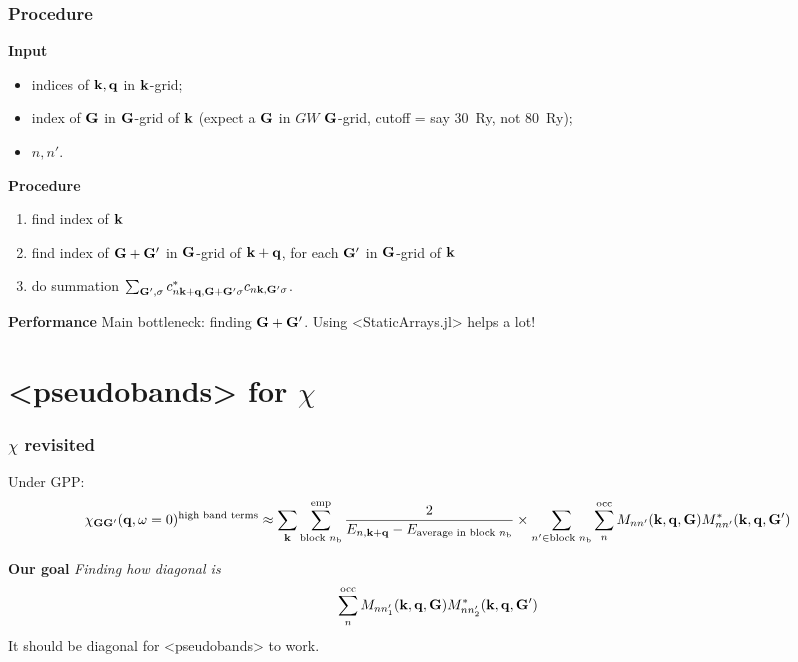 \documentclass[t]{beamer}
\newcommand{\shortcode}[1]{\texttt{#1}}
\def\\{}%
\def\texttt#1{<#1>}%
\begin{document}
\begin{frame}
\frametitle{Procedure}

\textbf{Input} 
\begin{itemize}
    \item indices of $\vb{k}, \vb{q}$ in $\vb{k}$-grid; 
    \item index of $\vb{G}$ in $\vb{G}$-grid of $\vb{k}$ 
    (expect a $\vb{G}$ in $GW$ $\vb{G}$-grid, 
    cutoff = say \SI{30}{Ry}, not \SI{80}{Ry});
    \item $n, n'$.
\end{itemize}

\textbf{Procedure}
\begin{enumerate}
    \item find index of $\vb{k}$
    \item find index of $\vb{G} + \vb{G}'$ in $\vb{G}$-grid of $\vb{k} + \vb{q}$,
    for each $\vb{G}'$ in $\vb{G}$-grid of $\vb{k}$
    \item do summation $\sum_{\vb{G}', \sigma} c^*_{n \vb{k} + \vb{q}, \vb{G} + \vb{G}' \sigma} c_{n \vb{k}, \vb{G}' \sigma}$.
\end{enumerate}    

\vspace{0.3cm}

\textbf{Performance} Main bottleneck: finding $\vb{G} + \vb{G}'$.
Using \shortcode{StaticArrays.jl} helps a lot! 

\end{frame}

\section{\shortcode{pseudobands} for $\chi$}

\begin{frame}
\frametitle{$\chi$ revisited}

Under GPP:
\begin{equation*}
    \begin{aligned}
        \chi_{\vb{G} \vb{G}'}(\vb{q}, \omega=0)^{\text{high band terms}}
        \approx \sum_{\vb{k}} \sum_{\text{block $n_{\text{b}}$}}^{\text{emp}} 
        \frac{
            2
        }{
            E_{n, \vb{k} + \vb{q}} - E_{\text{average in block $n_{\text{b}}$}} 
        } \\
        \times \sum_{n' \in \text{block $n_{\text{b}}$}} \sum_{n}^{\text{occ}} 
        M_{n n'} (\vb{k}, \vb{q}, \vb{G}) M^*_{nn'} (\vb{k}, \vb{q}, \vb{G}') 
    \end{aligned}
\end{equation*}

\vspace{0.5cm}

\textbf{Our goal} \emph{Finding how diagonal is}
\begin{equation*}
    \sum_{n}^{\text{occ}} 
        M_{n n'_1} (\vb{k}, \vb{q}, \vb{G}) M^*_{nn'_2} (\vb{k}, \vb{q}, \vb{G}') 
\end{equation*}
It should be diagonal for \shortcode{pseudobands} to work.

\end{frame}
\end{document}
